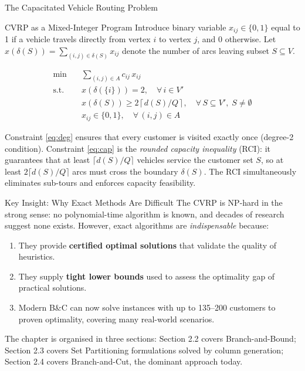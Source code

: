 \documentclass[aspectratio=169,10pt]{beamer}
\newcommand{\ceil}[1]{\left\lceil #1 \right\rceil}
\begin{document}
\begin{frame}[allowframebreaks]{The Capacitated Vehicle Routing Problem}
  \framebreak

  \begin{block}{CVRP as a Mixed-Integer Program}
    Introduce binary variable $x_{ij} \in \{0,1\}$ equal to 1 if a vehicle
    travels directly from vertex $i$ to vertex $j$, and 0 otherwise.
    Let $x(\delta(S)) = \sum_{(i,j)\in\delta(S)} x_{ij}$ denote the number
    of arcs leaving subset $S\subseteq V$.

    \begin{align}
      \min \quad   & \sum_{(i,j)\in A} c_{ij}\, x_{ij} \tag{P}\\
      \text{s.t.}\ & x(\delta(\{i\})) = 2, \quad \forall\, i \in V' \label{eq:deg}\\
                   & x(\delta(S)) \geq 2\ceil{d(S)/Q},\quad \forall\, S\subseteq V',\;S\neq\emptyset \label{eq:cap}\\
                   & x_{ij} \in \{0,1\},\quad \forall\,(i,j)\in A \label{eq:bin}
    \end{align}
  \end{block}

  Constraint \eqref{eq:deg} ensures that every customer is visited
  exactly once (degree-2 condition). Constraint \eqref{eq:cap} is the
  \emph{rounded capacity inequality} (RCI): it guarantees that at least
  $\lceil d(S)/Q \rceil$ vehicles service the customer set $S$, so at least
  $2\lceil d(S)/Q\rceil$ arcs must cross the boundary $\delta(S)$.
  The RCI simultaneously eliminates sub-tours and enforces capacity feasibility.

  \framebreak

  \begin{alertblock}{Key Insight: Why Exact Methods Are Difficult}
    The CVRP is NP-hard in the strong sense: no polynomial-time algorithm
    is known, and decades of research suggest none exists. However, exact
    algorithms are \emph{indispensable} because:
    \begin{enumerate}
      \item They provide \textbf{certified optimal solutions} that validate
            the quality of heuristics.
      \item They supply \textbf{tight lower bounds} used to assess the
            optimality gap of practical solutions.
      \item Modern B\&C can now solve instances with up to 135--200 customers
            to proven optimality, covering many real-world scenarios.
    \end{enumerate}
  \end{alertblock}

  \bigskip
  The chapter is organised in three sections: Section 2.2 covers
  Branch-and-Bound; Section 2.3 covers Set Partitioning formulations solved
  by column generation; Section 2.4 covers Branch-and-Cut, the dominant
  approach today.
\end{frame}
\end{document}
